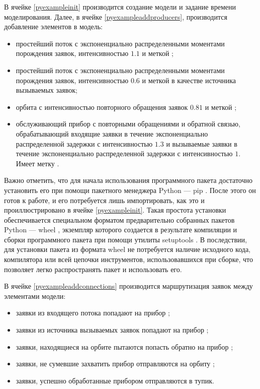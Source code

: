В ячейке \ref{pyexampleinit} производится создание модели и задание времени моделирования. Далее, в ячейке \ref{pyexampleaddproducers}, производится добавление элементов в модель:
\begin{itemize}
\item простейший поток с экспоненциально распределенными моментами порождения заявок, интенсивностью $1.1$ и меткой ;
\item простейший поток с экспоненциально распределенными моментами порождения заявок, интенсивностью $0.6$ и меткой  в качестве источника вызываемых заявок;
\item орбита с интенсивностью повторного обращения заявок $0.81$ и меткой ;
\item обслуживающий прибор с повторными обращениями и обратной связью, обрабатывающий входящие заявки в течение экспоненциально распределенной задержки с интенсивностью $1.3$ и вызываемые заявки в течение экспоненциально распределенной задержки с интенсивностью $1$. Имеет метку .
\end{itemize}

Важно отметить, что для начала использования программного пакета достаточно установить его при помощи пакетного менеджера Python --- pip \cite{pip}. После этого он готов к работе, и его потребуется лишь импортировать, как это и проиллюстрировано в ячейке \ref{pyexampleinit}. Такая простота установки обеспечивается специальном форматом предварительно собранных пакетов Python --- wheel \cite{wheel}, экземпляр которого создается в результате компиляции и сборки программного пакета при помощи утилиты setuptools \cite{setuptools}. В последствии, для установки пакета из формата wheel не потребуется наличие исходного кода, компилятора или всей цепочки инструментов, использовавшихся при сборке, что позволяет легко распространять пакет и использовать его.

В ячейке \ref{pyexampleaddconnections} производится маршрутизация заявок между элементами модели:
\begin{itemize}
	\item заявки из входящего потока  попадают на прибор ;
	\item заявки из источника вызываемых заявок  попадают на прибор ;
	\item заявки, находящиеся на орбите  пытаются попасть обратно на прибор ;
	\item заявки, не сумевшие захватить прибор  отправляются на орбиту ;
	\item заявки, успешно обработанные прибором  отправляются в тупик.
\end{itemize}

